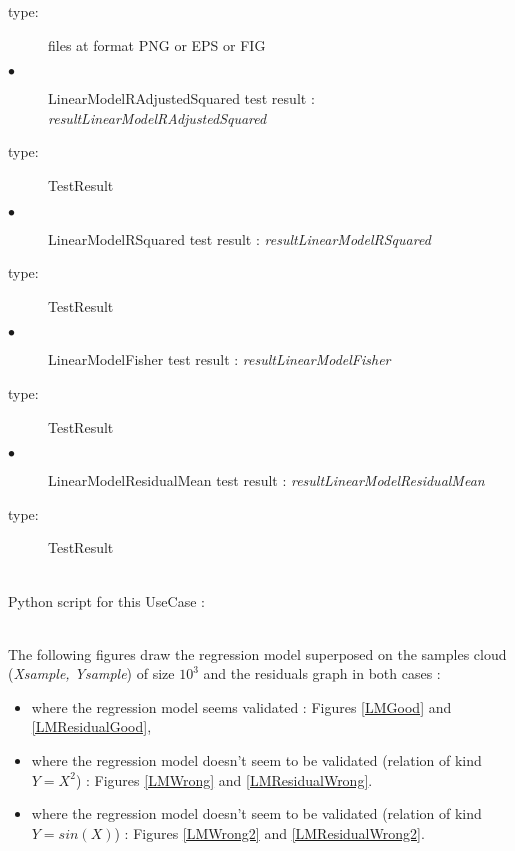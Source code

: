 {\begin{description}
                   \item[type:]  files at format PNG or EPS or FIG
                   \item[$\bullet$] LinearModelRAdjustedSquared test result : {\itshape resultLinearModelRAdjustedSquared}
                   \item[type:] TestResult
                   \item[$\bullet$] LinearModelRSquared test result : {\itshape resultLinearModelRSquared}
                   \item[type:] TestResult
                   \item[$\bullet$] LinearModelFisher test result : {\itshape resultLinearModelFisher}
                   \item[type:] TestResult
                   \item[$\bullet$] LinearModelResidualMean test result : {\itshape resultLinearModelResidualMean}
                   \item[type:] TestResult
                   \end{description}
                 }

                 \textspace\\
                 Python script for this UseCase :


                 \textspace\\



                 The following figures draw the regression model superposed on the samples cloud ({\itshape Xsample, Ysample}) of size $10^3$ and the residuals graph in both cases :
                 \begin{itemize}
                 \item where the regression model seems validated : Figures  \ref{LMGood} and \ref{LMResidualGood},
                 \item where the regression model doesn't seem to be validated (relation of kind $Y = X^2$) : Figures  \ref{LMWrong} and \ref{LMResidualWrong}.
                 \item where the regression model doesn't seem to be validated (relation of kind $Y = sin(X)$) : Figures  \ref{LMWrong2} and \ref{LMResidualWrong2}.
                 \end{itemize}


